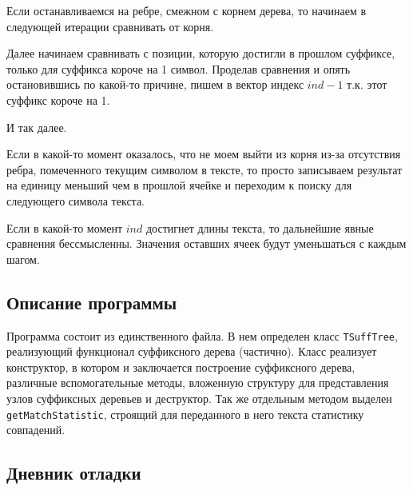 \documentclass[12pt]{article}
\begin{document}
Если останавливаемся на ребре, смежном с корнем дерева, то начинаем в следующей итерации сравнивать от корня.

Далее начинаем сравнивать с позиции, которую достигли в прошлом суффиксе, только для суффикса короче на 1 символ. Проделав сравнения и опять остановившись по какой-то причине, пишем в вектор индекс $ind - 1$ т.к. этот суффикс короче на 1.

И так далее.

Если в какой-то момент оказалось, что не моем выйти из корня из-за отсутствия ребра, помеченного текущим символом в тексте, то просто записываем результат на единицу меньший чем в прошлой ячейке и переходим к поиску для следующего символа текста.

Если в какой-то момент $ind$ достигнет длины текста, то дальнейшие явные сравнения бессмысленны. Значения оставших ячеек будут уменьшаться с каждым шагом.

\subsection*{Описание программы}

Программа состоит из единственного файла. В нем определен класс \verb|TSuffTree|, реализующий функционал суффиксного дерева (частично). Класс реализует конструктор, в котором и заключается построение суффиксного дерева, различные вспомогательные методы, вложенную структуру для представления узлов суффиксных деревьев и деструктор. Так же отдельным методом выделен \verb|getMatchStatistic|, строящий для переданного в него текста статистику совпадений.

\subsection*{Дневник отладки}
\end{document}
